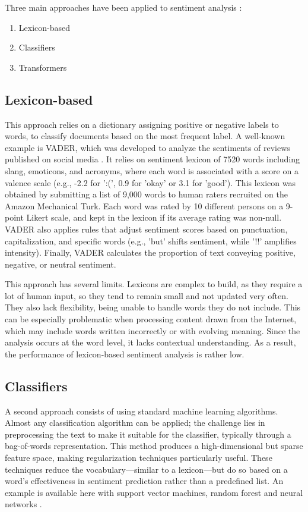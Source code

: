 \documentclass{article}
\begin{document}
Three main approaches have been applied to sentiment analysis \citep{hartmann_more_2023}:
\begin{enumerate}
    \item Lexicon-based
    \item Classifiers
    \item Transformers
\end{enumerate}

\subsection{Lexicon-based}

This approach relies on a dictionary assigning positive or negative labels to words, to classify documents based on the most frequent label. A well-known example is VADER, which was developed to analyze the sentiments of reviews published on social media \citep{hutto_vader_2014}. It relies on sentiment lexicon of 7520 words including slang, emoticons, and acronyms, where each word is associated with a score on a valence scale (e.g., -2.2 for ':(', 0.9 for 'okay' or 3.1 for 'good'). This lexicon was obtained by submitting a list of 9,000 words to human raters recruited on the Amazon Mechanical Turk. Each word was rated by 10 different persons on a 9-point Likert scale, and kept in the lexicon if its average rating was non-null. VADER also applies rules that adjust sentiment scores based on punctuation, capitalization, and specific words (e.g., 'but' shifts sentiment, while '!!' amplifies intensity). Finally, VADER calculates the proportion of text conveying positive, negative, or neutral sentiment.

This approach has several limits. Lexicons are complex to build, as they require a lot of human input, so they tend to remain small and not updated very often. They also lack flexibility, being unable to handle words they do not include. This can be especially problematic when processing content drawn from the Internet, which may include words written incorrectly or with evolving meaning. Since the analysis occurs at the word level, it lacks contextual understanding. As a result, the performance of lexicon-based sentiment analysis is rather low.

\subsection{Classifiers}

A second approach consists of using standard machine learning algorithms. Almost any classification algorithm can be applied; the challenge lies in preprocessing the text to make it suitable for the classifier, typically through a bag-of-words representation. This method produces a high-dimensional but sparse feature space, making regularization techniques particularly useful. These techniques reduce the vocabulary—similar to a lexicon—but do so based on a word’s effectiveness in sentiment prediction rather than a predefined list. An example is available here with support vector machines, random forest and neural networks \citep{wang_is_2024}.
\end{document}
